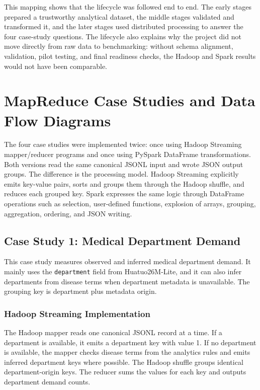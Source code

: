 \documentclass[12pt,a4paper]{article}
\let\oldsection\section
\renewcommand{\section}{\clearpage\oldsection}
\begin{document}
This mapping shows that the lifecycle was followed end to end. The early stages prepared a trustworthy analytical dataset, the middle stages validated and transformed it, and the later stages used distributed processing to answer the four case-study questions. The lifecycle also explains why the project did not move directly from raw data to benchmarking: without schema alignment, validation, pilot testing, and final readiness checks, the Hadoop and Spark results would not have been comparable.

\section{MapReduce Case Studies and Data Flow Diagrams}

The four case studies were implemented twice: once using Hadoop Streaming mapper/reducer programs and once using PySpark DataFrame transformations. Both versions read the same canonical JSONL input and wrote JSON output groups. The difference is the processing model. Hadoop Streaming explicitly emits key-value pairs, sorts and groups them through the Hadoop shuffle, and reduces each grouped key. Spark expresses the same logic through DataFrame operations such as selection, user-defined functions, explosion of arrays, grouping, aggregation, ordering, and JSON writing.

\subsection{Case Study 1: Medical Department Demand}

This case study measures observed and inferred medical department demand. It mainly uses the \texttt{department} field from Huatuo26M-Lite, and it can also infer departments from disease terms when department metadata is unavailable. The grouping key is department plus metadata origin.

\subsubsection*{Hadoop Streaming Implementation}

The Hadoop mapper reads one canonical JSONL record at a time. If a department is available, it emits a department key with value 1. If no department is available, the mapper checks disease terms from the analytics rules and emits inferred department keys where possible. The Hadoop shuffle groups identical department-origin keys. The reducer sums the values for each key and outputs department demand counts.
\end{document}

